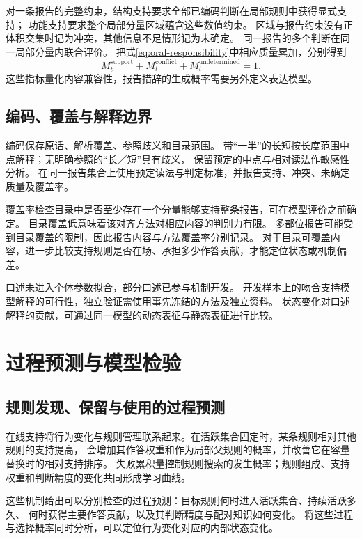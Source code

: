 \documentclass[11pt,a4paper]{article}
\numberwithin{equation}{section}
\begin{document}
对一条报告的完整约束，结构支持要求全部已编码判断在局部规则中获得显式支持；
功能支持要求整个局部分量区域蕴含这些数值约束。
区域与报告约束没有正体积交集时记为冲突，其他信息不足情形记为未确定。
同一报告的多个判断在同一局部分量内联合评价。
把式\eqref{eq:oral-responsibility}中相应质量累加，分别得到
\begin{equation}
M_t^{\mathrm{support}}+M_t^{\mathrm{conflict}}+M_t^{\mathrm{undetermined}}=1.
\end{equation}
这些指标量化内容兼容性，报告措辞的生成概率需要另外定义表达模型。

\subsection{编码、覆盖与解释边界}
编码保存原话、解析覆盖、参照歧义和目录范围。
带“一半”的长短按长度范围中点解释；无明确参照的“长／短”具有歧义，
保留预定的中点与相对读法作敏感性分析。
在同一报告集合上使用预定读法与判定标准，并报告支持、冲突、未确定质量及覆盖率。

覆盖率检查目录中是否至少存在一个分量能够支持整条报告，可在模型评价之前确定。
目录覆盖低意味着该对齐方法对相应内容的判别力有限。
多部位报告可能受到目录覆盖的限制，因此报告内容与方法覆盖率分别记录。
对于目录可覆盖内容，进一步比较支持规则是否在场、承担多少作答贡献，才能定位状态或机制偏差。

口述未进入个体参数拟合，部分口述已参与机制开发。
开发样本上的吻合支持模型解释的可行性，独立验证需使用事先冻结的方法及独立资料。
状态变化对口述解释的贡献，可通过同一模型的动态表征与静态表征进行比较。

\section{过程预测与模型检验}
\label{sec:validation}

\subsection{规则发现、保留与使用的过程预测}
在线支持将行为变化与规则管理联系起来。在活跃集合固定时，某条规则相对其他规则的支持提高，
会增加其作答权重和作为局部父规则的概率，并改善它在容量替换时的相对支持排序。
失败累积量控制规则搜索的发生概率；规则组成、支持权重和判断精度的变化共同形成学习曲线。

这些机制给出可以分别检查的过程预测：目标规则何时进入活跃集合、持续活跃多久、
何时获得主要作答贡献，以及其判断精度与配对知识如何变化。
将这些过程与选择概率同时分析，可以定位行为变化对应的内部状态变化。
\end{document}
